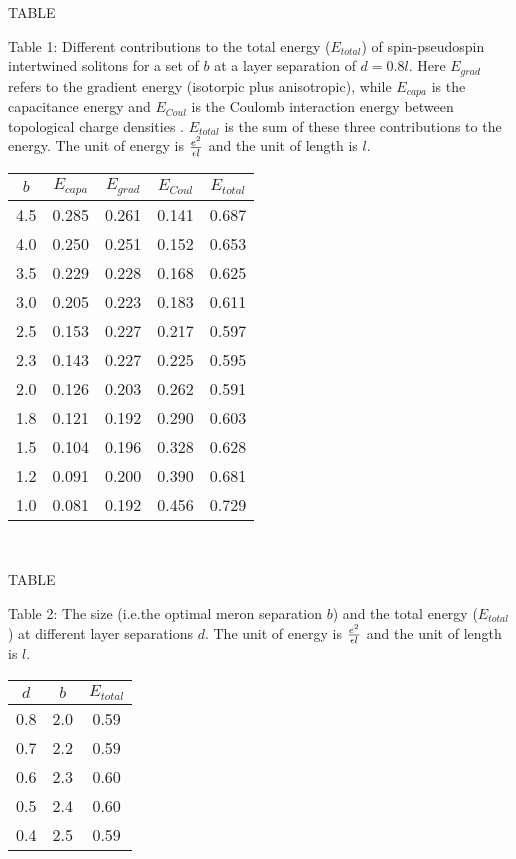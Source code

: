 \newpage
\begin{center}
TABLE
\end{center}
\noindent Table 1: Different contributions to the total energy ($E_{total}$) 
of spin-pseudospin intertwined
solitons for a set of $b$ at a layer separation of $d = 0.8l$.
Here $E_{grad}$ refers to the gradient energy
(isotorpic plus anisotropic), while
$E_{capa}$ is the capacitance
energy and $E_{Coul}$ is the Coulomb interaction energy
between topological charge densities . $E_{total}$ is the
sum of these three contributions to the energy. The unit of
energy is $e^2 \over \epsilon l$ and the unit of length is $l$.

\begin{center}
\begin{tabular}{|c|c|c|c|c|}
\hline
$b$ & $E_{capa}$ & $E_{grad}$ & $E_{Coul}$ & $E_{total}$ 
\\
\hline
4.5 & 0.285 & 0.261 & 0.141 & 0.687 \\
\hline
4.0 & 0.250 & 0.251 & 0.152 & 0.653 \\
\hline
3.5 & 0.229 & 0.228 & 0.168 & 0.625 \\
\hline
3.0 & 0.205 & 0.223 & 0.183 & 0.611 \\
\hline
2.5 & 0.153 & 0.227 & 0.217 & 0.597 \\
\hline
2.3 & 0.143 & 0.227 & 0.225 & 0.595 \\
\hline
2.0 & 0.126 & 0.203 & 0.262 & 0.591 \\
\hline
1.8 & 0.121 & 0.192 & 0.290 & 0.603 \\
\hline
1.5 & 0.104 & 0.196 & 0.328 & 0.628 \\
\hline
1.2 & 0.091 & 0.200 & 0.390 & 0.681 \\
\hline
1.0 & 0.081 & 0.192 & 0.456 & 0.729 \\
\hline
\end{tabular}
\\
\end{center}

\newpage
\begin{center}
TABLE
\end{center}
\noindent Table 2:
The size (i.e.the optimal meron separation $b$) and the total energy 
($E_{total}$) at different layer separations $d$. The unit
of energy is $e^2 \over \epsilon l$ and the unit of length is
$l$.
\begin{center}
\begin{tabular}{|c|c|c|}
\hline
$d$ & $b$ & $E_{total}$ 
\\
\hline
0.8 & 2.0 & 0.59 \\
\hline
0.7 & 2.2 & 0.59 \\
\hline
0.6 & 2.3 & 0.60 \\
\hline
0.5 & 2.4 & 0.60 \\
\hline
0.4 & 2.5 & 0.59 \\
\hline
\end{tabular}
\\
\end{center}

